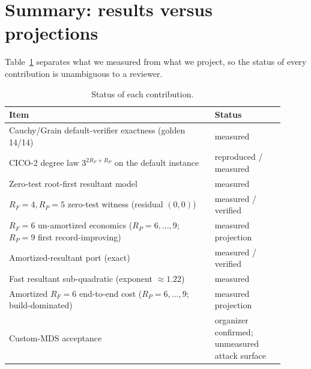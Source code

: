 \documentclass[11pt]{article}
\newcommand{\RF}{R_F}
\newcommand{\RP}{R_P}
\theoremstyle{plain}
\begin{document}
\section{Summary: results versus projections}\label{sec:summary}
Table~\ref{tab:status} separates what we measured from what we project, so the
status of every contribution is unambiguous to a reviewer.
\begin{table}[ht]\centering\small
\caption{Status of each contribution.}\label{tab:status}
\begin{tabular}{@{}p{0.68\linewidth}p{0.23\linewidth}@{}}
\toprule
Item & Status \\
\midrule
Cauchy/Grain default-verifier exactness (golden 14/14) & measured \\
CICO-2 degree law $3^{2\RF+\RP}$ on the default instance & reproduced / measured \\
Zero-test root-first resultant model & measured \\
$\RF=4,\RP=5$ zero-test witness (residual $(0,0)$) & measured / verified \\
$\RF=6$ un-amortized economics ($\RP=6,\ldots,9$; $\RP=9$ first record-improving) & measured projection \\
Amortized-resultant port (exact)~\cite{cico2026} & measured / verified \\
Fast resultant sub-quadratic (exponent $\approx 1.22$) & measured \\
Amortized $\RF=6$ end-to-end cost ($\RP=6,\ldots,9$; build-dominated) & measured projection \\
Custom-MDS acceptance & organizer confirmed; unmeasured attack surface \\
\bottomrule
\end{tabular}
\end{table}
\end{document}
